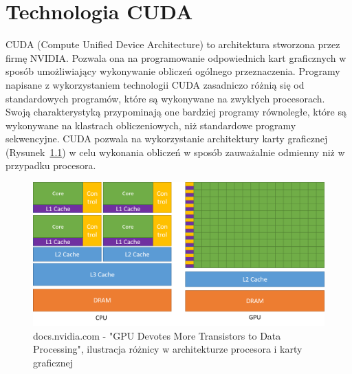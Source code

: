 \chapter{Technologia CUDA}

CUDA (Compute Unified Device Architecture) to architektura stworzona przez firmę NVIDIA. Pozwala ona na programowanie odpowiednich kart graficznych w sposób umożliwiający wykonywanie obliczeń ogólnego przeznaczenia. Programy napisane z wykorzystaniem technologii CUDA zasadniczo różnią się od standardowych programów, które są wykonywane na zwykłych procesorach. Swoją charakterystyką przypominają one bardziej programy równoległe, które są wykonywane na klastrach obliczeniowych, niż standardowe programy sekwencyjne. CUDA pozwala na wykorzystanie architektury karty graficznej (Rysunek~\ref{fig:GPU Devotes More Transistors to Data Processing}) w celu wykonania obliczeń w sposób zauważalnie odmienny niż w przypadku procesora.
\begin{figure}
    \centering
    \includegraphics[scale=0.5]{./fig/gpu-devotes-more-transistors-to-data-processing.png}
    \caption{docs.nvidia.com - "GPU Devotes More Transistors to Data Processing", ilustracja różnicy w architekturze procesora i karty graficznej}
    \label{fig:GPU Devotes More Transistors to Data Processing}
\end{figure}

